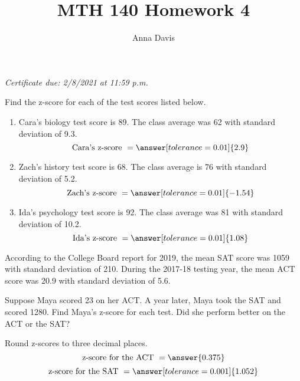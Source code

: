 \documentclass{ximera}
\author{Anna Davis} \title{MTH 140 Homework 4}
\begin{document}
\begin{abstract}

\end{abstract}
\maketitle
 \textit{Certificate due: 2/8/2021 at 11:59 p.m.}

\begin{problem}\label{prob:140hom3prob5}
Find the z-score for each of the test scores listed below.
\begin{enumerate}
    \item Cara's biology test score is 89.  The class average was 62 with standard deviation of 9.3.
    $$\mbox{Cara's z-score }=\answer[tolerance=0.01]{2.9}$$
    \item Zach's history test score is 68.  The class average is 76 with standard deviation of 5.2.
    $$\mbox{Zach's z-score }=\answer[tolerance=0.01]{-1.54}$$
    \item Ida's psychology test score is 92.  The class average was 81 with standard deviation of 10.2.
    $$\mbox{Ida's z-score }=\answer[tolerance=0.01]{1.08}$$
    
\end{enumerate}
\end{problem}

\begin{problem}\label{prob:140hom3prob3}
According to the College Board report for 2019, the mean SAT score was 1059 with standard deviation of 210.  During the 2017-18 testing year, the mean ACT score was 20.9 with standard deviation of 5.6.  

Suppose Maya scored 23 on her ACT.  A year later, Maya took the SAT and scored 1280.  Find Maya's z-score for each test.  Did she perform better on the ACT or the SAT?

Round z-scores to three decimal places.
$$\mbox{z-score for the ACT }=\answer{0.375}$$
$$\mbox{z-score for the SAT }=\answer[tolerance=0.001]{1.052}$$

\begin{multipleChoice}  
\end{multipleChoice}
\end{problem}
\end{document}
